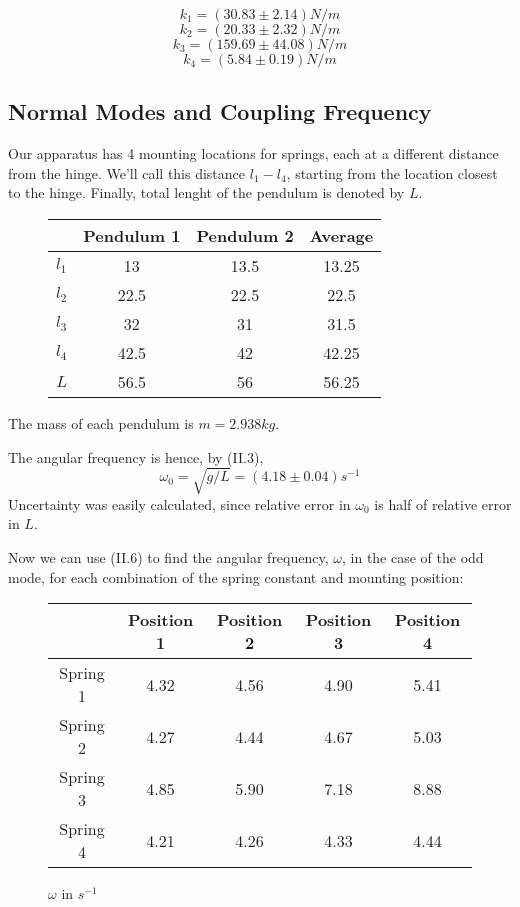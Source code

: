 \documentclass[main.tex]{subfiles}
\begin{document}
$$ k_1 = (30.83 \pm 2.14) N/m$$
$$ k_2 = (20.33 \pm 2.32) N/m $$ 
$$ k_3 = (159.69 \pm 44.08) N/m $$
$$ k_4 = (5.84 \pm 0.19) N/m $$

\subsection{Normal Modes and Coupling Frequency}

Our apparatus has 4 mounting locations for springs, each at a different distance from the hinge. We'll call this distance $l_1-l_4$, starting from the location closest to the hinge. Finally, total lenght of the pendulum is denoted by $L$.

\begin{figure}[H]
\begin{tabular}{|c|c|c|c|}
\hline
 & Pendulum 1 & Pendulum 2 & Average \\
\hline
$l_1$ & 13 & 13.5 & 13.25 \\
$l_2$ & 22.5 & 22.5 & 22.5 \\
$l_3$ & 32 & 31 & 31.5 \\
$l_4$ & 42.5 & 42 & 42.25 \\
$L$ & 56.5 & 56 & 56.25 \\
\hline
\end{tabular}

\end{figure}

The mass of each pendulum is $ m = 2.938kg $.

The angular frequency is hence, by (II.3), $$ \omega_0 = \sqrt{g/L} = (4.18 \pm 0.04)s^{-1} $$ Uncertainty was easily calculated, since relative error in $ \omega_0$ is half of relative error in $L$. 

Now we can use (II.6) to find the angular frequency, $\omega$, in the case of the odd mode, for each combination of the spring constant and mounting position:

\begin{figure}[H]
\begin{tabular}{|c|c|c|c|c|}
\hline
& Position 1 & Position 2 & Position 3 & Position 4 \\
\hline
Spring 1 & 4.32 & 4.56 & 4.90 & 5.41 \\
\hline
Spring 2 & 4.27 & 4.44 & 4.67 & 5.03 \\
\hline
Spring 3 & 4.85 & 5.90 & 7.18 & 8.88 \\
\hline
Spring 4 & 4.21 & 4.26 & 4.33 & 4.44 \\
\hline
\end{tabular}
\caption{$\omega$ in $s^{-1}$}
\end{figure}
\end{document}
